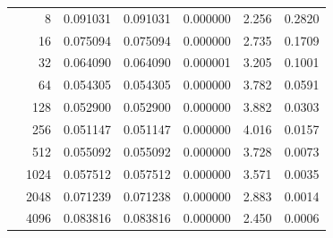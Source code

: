 \documentclass[a4paper,11pt]{article}
\begin{document}
\begin{center}
\begin{longtable}{crccccc}
                       & 8    & 0.091031 & 0.091031 & 0.000000 & 2.256  & 0.2820 \\
                       & 16   & 0.075094 & 0.075094 & 0.000000 & 2.735  & 0.1709 \\
                       & 32   & 0.064090 & 0.064090 & 0.000001 & 3.205  & 0.1001 \\
                       & 64   & 0.054305 & 0.054305 & 0.000000 & 3.782  & 0.0591 \\
                       & 128  & 0.052900 & 0.052900 & 0.000000 & 3.882  & 0.0303 \\
                       & 256  & 0.051147 & 0.051147 & 0.000000 & 4.016  & 0.0157 \\
                       & 512  & 0.055092 & 0.055092 & 0.000000 & 3.728  & 0.0073 \\
                       & 1024 & 0.057512 & 0.057512 & 0.000000 & 3.571  & 0.0035 \\
                       & 2048 & 0.071239 & 0.071238 & 0.000000 & 2.883  & 0.0014 \\
                       & 4096 & 0.083816 & 0.083816 & 0.000000 & 2.450  & 0.0006 \\
\end{longtable}
\end{center}
\end{document}
